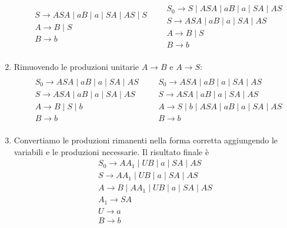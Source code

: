 \documentclass[italian]{article}
\newcommand{\taleche}{\;|\;}
\begin{document}
\begin{enumerate}
\begin{gather*}
\begin{align*}
\begin{split}
	& S \to ASA \taleche aB \taleche a \taleche SA \taleche AS \taleche S \\
	& A \to B \taleche S \\
	& B \to b
	\end{split}
	&
	\begin{split}
	& S_0 \to S \taleche ASA \taleche aB \taleche a \taleche SA \taleche AS \\
	& S \to ASA \taleche aB \taleche a \taleche SA \taleche AS \\
	& A \to B \taleche S\\
	& B \to b 
	\end{split}
	\end{align*}
	\end{gather*}
	\item Rimuovendo le produzioni unitarie $A\to B$ e $A\to S$:
	\begin{gather*}
	\begin{align*}
	\begin{split}
	& S_0 \to ASA \taleche aB \taleche a \taleche SA \taleche AS \\
	& S \to ASA \taleche aB \taleche a \taleche SA \taleche AS \\
	& A \to B \taleche S \taleche b \\
	& B \to b
	\end{split}
	&
	\begin{split}
	& S_0 \to ASA \taleche aB \taleche a \taleche SA \taleche AS \\
	& S \to ASA \taleche aB \taleche a \taleche SA \taleche AS \\
	& A \to S \taleche b \taleche ASA \taleche aB \taleche a \taleche SA \taleche AS \\
	& B \to b
	\end{split}
	\end{align*}
	\end{gather*}
	\item Convertiamo le produzioni rimanenti nella forma corretta aggiungendo le variabili e le produzioni necessarie. Il risultato finale è
		\begin{gather*}
	S_0 \to AA_1 \taleche UB \taleche a \taleche SA \taleche AS \\
	S \to AA_1 \taleche UB \taleche a \taleche SA \taleche AS \\
	A \to B \taleche AA_1 \taleche UB \taleche a \taleche SA \taleche AS \\
	A_1 \to SA \\
	U \to a \\
	B \to b
	\end{gather*}
\end{enumerate}
\end{document}
